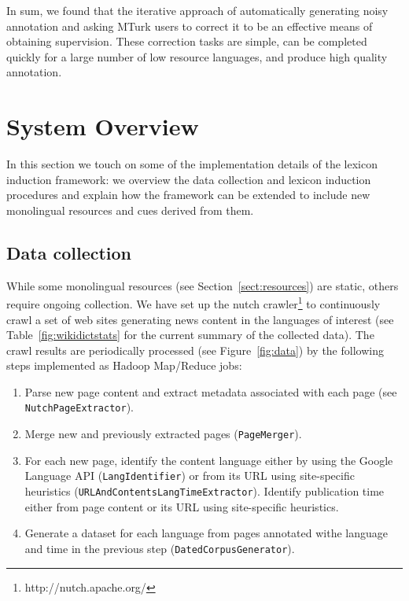 \documentclass{article}
\newcommand{\secref}[1]{Section~\ref{#1}}
\newcommand{\tabref}[1]{Table~\ref{#1}}
\newcommand{\figref}[1]{Figure~\ref{#1}}
\newcommand{\code}[1]{{\small \tt #1}}
\begin{document}
In sum, we found that the iterative approach of automatically generating noisy annotation and asking MTurk users to correct it to be an effective means of obtaining supervision.  These correction tasks are simple, can be completed quickly for a large number of low resource languages, and produce high quality annotation.

\section{System Overview}

In this section we touch on some of the implementation details of the lexicon induction framework: we overview the data collection and lexicon induction procedures and explain how the framework can be extended to include new monolingual resources and cues derived from them.  

\subsection{Data collection} \label{sect:datacollect}

While some monolingual resources (see \secref{sect:resources}) are static, others require ongoing collection.  We have set up the nutch crawler\footnote{http://nutch.apache.org/} to continuously crawl a set of web sites generating news content in the languages of interest (see \tabref{fig:wikidictstats} for the current summary of the collected data).  The crawl results are periodically processed (see \figref{fig:data}) by the following steps implemented as Hadoop Map/Reduce jobs:

\begin{enumerate}
 \item Parse new page content and extract metadata associated with each page (see \code{NutchPageExtractor}).
 \item Merge new and previously extracted pages (\code{PageMerger}).
 \item For each new page, identify the content language either by using the Google Language API (\code{LangIdentifier}) or from its URL using site-specific heuristics (\code{URLAndContentsLangTimeExtractor}).  Identify publication time either from page content or its URL using site-specific heuristics.
 \item Generate a dataset for each language from pages annotated withe language and time in the previous step (\code{DatedCorpusGenerator}).  
\end{enumerate}
\end{document}
